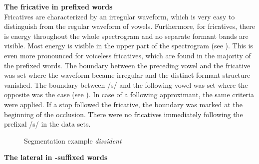 \textbf{The fricative in prefixed words}\\




Fricatives are characterized by an irregular waveform, which is very easy to distinguish from the regular waveform of vowels. Furthermore, for fricatives, there is energy throughout the whole spectrogram and no separate formant bands are visible. Most energy is visible in the upper part of the spectrogram (see ). This is even more pronounced for voiceless fricatives, which are found in the majority of the prefixed words.
The boundary between the preceding vowel and the fricative was set where the waveform became irregular and the distinct formant structure vanished. The boundary between /s/ and the following vowel was set where the opposite was the case (see ). In case of a following approximant, the same criteria were applied. If a stop followed the fricative, the boundary was marked at the beginning of the occlusion. There were no fricatives immediately following the prefixal /s/ in the data sets.\\

\begin{figure} [H]
	
	\caption{Segmentation example \textit{dissident}}
	\label{fig:segmentation dissident}
\end{figure}



\textbf {The lateral in -suffixed words} \label{ly-segmentation}\\




